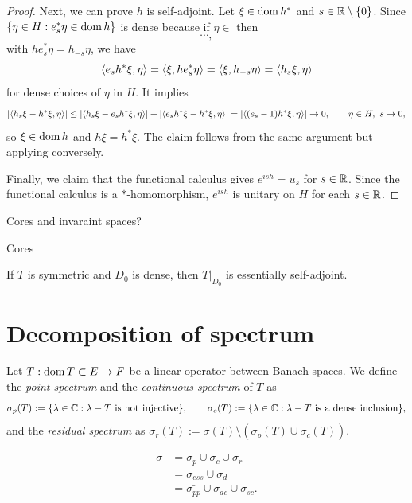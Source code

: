 \documentclass{../../large}
\begin{document}
\begin{proof}
Next, we can prove $h$ is self-adjoint.
Let $\xi\in\operatorname{dom} h^*$ and $s\in\mathbb{R}\setminus\{0\}$.
Since $\{\eta\in H:e_s^*\eta\in\operatorname{dom} h\}$ is dense because if $\eta\in$ then
\[\cdots,\]
with $he_s^*\eta=h_{-s}\eta$, we have
\[\langle e_sh^*\xi,\eta\rangle=\langle\xi,he_s^*\eta\rangle=\langle\xi,h_{-s}\eta\rangle=\langle h_s\xi,\eta\rangle\]
for dense choices of $\eta$ in $H$.
It implies
\[|\langle h_s\xi-h^*\xi,\eta\rangle|\le|\langle h_s\xi-e_sh^*\xi,\eta\rangle|+|\langle e_sh^*\xi-h^*\xi,\eta\rangle|=|\langle(e_s-1)h^*\xi,\eta\rangle|\to0,\qquad\eta\in H,\ s\to0,\]
so $\xi\in\operatorname{dom} h$ and $h\xi=h^*\xi$.
The claim follows from the same argument but applying conversely.

Finally, we claim that the functional calculus gives $e^{ish}=u_s$ for $s\in\mathbb{R}$.
Since the functional calculus is a $*$-homomorphism, $e^{ish}$ is unitary on $H$ for each $s\in\mathbb{R}$.
\end{proof}

Cores and invaraint spaces?


\begin{prb}
Cores
\begin{parts}
\item If $T$ is symmetric and $D_0$ is dense, then $T|_{D_0}$ is essentially self-adjoint.
\end{parts}
\end{prb}

\begin{prb}
\end{prb}








\section{Decomposition of spectrum}

\begin{prb}
Let $T:\operatorname{dom} T\subset E\to F$ be a linear operator between Banach spaces.
We define the \emph{point spectrum} and the \emph{continuous spectrum} of $T$ as
\[\sigma_p(T):=\{\lambda\in\mathbb{C}:\lambda-T\text{ is not injective}\},\qquad
\sigma_c(T):=\{\lambda\in\mathbb{C}:\lambda-T\text{ is a dense inclusion}\},\]
and the \emph{residual spectrum} as $\sigma_r(T):=\sigma(T)\setminus(\sigma_p(T)\cup\sigma_c(T))$.
\end{prb}

\begin{align*}
\sigma
&=\sigma_p\cup\sigma_c\cup\sigma_r\\
&=\sigma_{ess}\cup\sigma_d\\
&=\bar{\sigma_{pp}}\cup\sigma_{ac}\cup\sigma_{sc}.
\end{align*}
\end{document}
